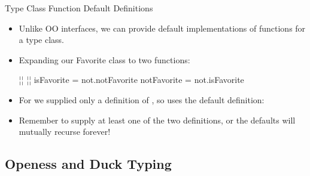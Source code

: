 \documentclass[xcolor=dvipsnames]{beamer}          %
\newcommand{\lT}[1]{\color{Fuchsia}{#1}}        %
\newcommand{\lS}[1]{\color{Green}{#1}}
\begin{document}
\begin{frame}[fragile]{Type Class Function Default Definitions}
\begin{itemize}
    \item Unlike OO interfaces, we can provide default implementations of
        functions for a type class.
    \item Expanding our Favorite class to two functions:
        \begin{hlisting}
            ¦\lT{class Favorite a where}¦
                ¦\lT{isFavorite, notFavorite :: a -> Bool}¦
                isFavorite  = not.notFavorite
                notFavorite = not.isFavorite
        \end{hlisting}
    \item For  we supplied only a definition of ,
        so  uses the default definition:
    \item Remember to supply at least one of the two definitions, or
        the defaults will mutually recurse forever!
\end{itemize}
\end{frame}


\subsection{Openess and Duck Typing}
\end{document}
